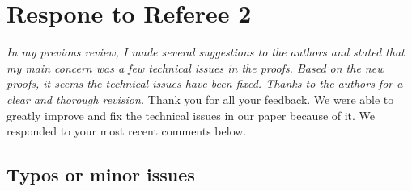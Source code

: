 \documentclass[11pt]{article}
\newcommand{\1}{\ensuremath{\mathbf{1}}} %
\theoremstyle{thm-sf}
\begin{document}
	\newpage
	\section{Respone to Referee 2}
	{
	\it 
	In my previous review, I made several suggestions to the authors and stated that my main concern was a few technical issues in the proofs. Based on the new proofs, it seems the technical issues have been fixed. Thanks to the authors for a clear and thorough revision.
	}
    \newline
    \newline
    Thank you for all your feedback. We were able to greatly improve and fix the technical issues in our paper because of it. We responded to your most recent comments below.
	\subsection{Typos or minor issues}
	
\end{document}
